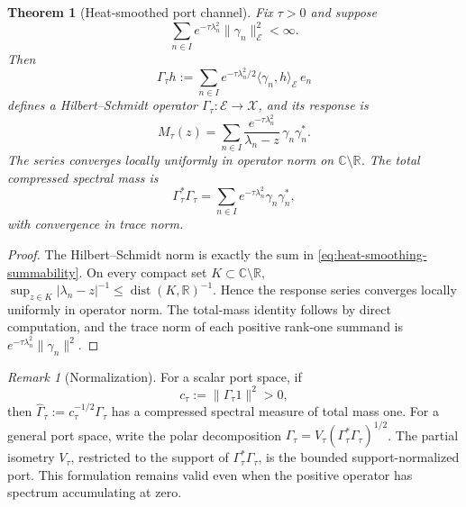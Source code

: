 \documentclass[11pt,reqno]{scrartcl}
\newcommand{\CC}{\mathbb C}
\newcommand{\RR}{\mathbb R}
\newcommand{\inner}[2]{\langle #1,#2\rangle}
\newcommand{\scrX}{\mathscr X}
\newcommand{\scrE}{\mathscr E}
\theoremstyle{plain}
\newtheorem{theorem}{Theorem}[section]
\theoremstyle{definition}
\theoremstyle{remark}
\newtheorem{remark}[remark]{Remark}
\begin{document}
\begin{theorem}[Heat-smoothed port channel]
\label{thm:heat-smoothed-channel}
Fix \(\tau>0\) and suppose
\begin{equation}
  \sum_{n\in I}e^{-\tau\lambda_n^2}\|\gamma_n\|_{\scrE}^2<\infty.
  \label{eq:heat-smoothing-summability}
\end{equation}
Then
\begin{equation}
  \Gamma_\tau h
  :=\sum_{n\in I}
  e^{-\tau\lambda_n^2/2}
  \inner{\gamma_n}{h}_{\scrE}\,e_n
  \label{eq:heat-smoothed-input}
\end{equation}
defines a Hilbert--Schmidt operator \(\Gamma_\tau:\scrE\to\scrX\), and
its response is
\begin{equation}
  \boxed{
  M_\tau(z)
  =\sum_{n\in I}
  \frac{e^{-\tau\lambda_n^2}}
  {\lambda_n-z}\,
  \gamma_n\gamma_n^*.}
  \label{eq:heat-smoothed-response}
\end{equation}
The series converges locally uniformly in operator norm on
\(\CC\setminus\RR\).  The total compressed spectral mass is
\begin{equation}
  \boxed{
  \Gamma_\tau^*\Gamma_\tau
  =\sum_{n\in I}e^{-\tau\lambda_n^2}\gamma_n\gamma_n^*,}
  \label{eq:heat-smoothed-total-mass}
\end{equation}
with convergence in trace norm.
\end{theorem}

\begin{proof}
The Hilbert--Schmidt norm is exactly the sum in
\eqref{eq:heat-smoothing-summability}.  On every compact set \(K\subset\CC\setminus\RR\),
\(\sup_{z\in K}|\lambda_n-z|^{-1}\leq\operatorname{dist}(K,\RR)^{-1}\).
Hence the response series converges locally uniformly in operator norm.
The total-mass identity follows by direct computation, and the trace norm of
each positive rank-one summand is
\(e^{-\tau\lambda_n^2}\|\gamma_n\|^2\).
\end{proof}

\begin{remark}[Normalization]
\label{rem:heat-channel-normalization}
For a scalar port space, if
\begin{equation}
  c_\tau:=\|\Gamma_\tau 1\|^2>0,
\end{equation}
then \(\widehat\Gamma_\tau:=c_\tau^{-1/2}\Gamma_\tau\) has a compressed
spectral measure of total mass one.  For a general port space, write the polar decomposition
\(\Gamma_\tau=V_\tau(\Gamma_\tau^*\Gamma_\tau)^{1/2}\).  The partial
isometry \(V_\tau\), restricted to the support of
\(\Gamma_\tau^*\Gamma_\tau\), is the bounded support-normalized port.  This
formulation remains valid even when the positive operator has spectrum
accumulating at zero.
\end{remark}
\end{document}
